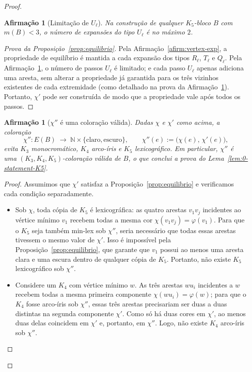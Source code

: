 \documentclass[reqno, 12pt]{amsart}
\numberwithin{equation}{section}
\theoremstyle{plain}
\newtheorem{afirmacao}[theorem]{Afirmação}
\theoremstyle{definition}
\newcommand{\maxdens}{m}
\begin{document}
\begin{proof}
\begin{afirmacao}[Limitação de $U_\ell$]
\label{afirm:ulimit}
Na construção de qualquer $K_5$-bloco $B$ com $\maxdens(B) < 3$,
o número de expansões do tipo $U_\ell$ é no máximo $2$.
\end{afirmacao}

\begin{proof}[Prova da Proposição~\ref{prop:equilibrio}]
Pela Afirmação~\ref{afirm:vertex-exp}, a propriedade de equilíbrio é mantida a cada
expansão dos tipos $R_\ell$, $T_\ell$ e $Q_\ell$.
Pela Afirmação~\ref{afirm:ulimit}, o número de passos $U_\ell$ é limitado;
e cada passo $U_\ell$ apenas adiciona uma aresta, sem alterar a propriedade já garantida para
os três vizinhos existentes de cada extremidade (como detalhado na prova da Afirmação~\ref{afirm:ulimit}).
Portanto, $\chi'$ pode ser construída de modo que a propriedade vale após todos os passos.
\end{proof}

\begin{afirmacao}[$\chi''$ é uma coloração válida]
\label{afirm:chipp}
Dadas $\chi$ e $\chi'$ como acima, a coloração
\[
  \chi'': E(B) \;\longrightarrow\; \mathbb{N} \times \{\text{claro}, \text{escuro}\},
  \qquad \chi''(e) := \bigl(\chi(e),\, \chi'(e)\bigr),
\]
evita $K_3$ monocromático, $K_4$ arco-íris e $K_5$ lexicográfico.
Em particular, $\chi''$ é uma $(K_3, K_4, K_5)$-coloração válida de $B$,
o que conclui a prova do Lema~\ref{lem:0-statement-K5}.
\end{afirmacao}

\begin{proof}
Assumimos que $\chi'$ satisfaz a Proposição~\ref{prop:equilibrio} e verificamos cada condição
separadamente.

\begin{itemize}
  \item Sob $\chi$, toda cópia de $K_5$ é lexicográfica: as quatro arestas $v_1v_j$
  incidentes ao vértice mínimo $v_1$ recebem todas a mesma cor $\chi(v_1v_j) = \varphi(v_1)$.
  Para que o $K_5$ seja também min-lex sob $\chi''$, seria necessário que todas essas
  arestas tivessem o mesmo valor de $\chi'$. Isso é impossível pela
  Proposição~\ref{prop:equilibrio}, que garante que $v_1$ possui ao menos uma aresta
  clara e uma escura dentro de qualquer cópia de $K_5$. Portanto, não existe
  $K_5$ lexicográfico sob $\chi''$.

  \item Considere um $K_4$ com vértice mínimo $w$. As três arestas $wu_i$ incidentes
  a $w$ recebem todas a mesma primeira componente $\chi(wu_i) = \varphi(w)$; para que
  o $K_4$ fosse arco-íris sob $\chi''$, essas três arestas precisariam ser duas a duas
  distintas na segunda componente $\chi'$. Como só há duas cores em $\chi'$, ao menos
  duas delas coincidem em $\chi'$ e, portanto, em $\chi''$. Logo, não existe
  $K_4$ arco-íris sob $\chi''$.


\end{itemize}
\end{proof}
\end{proof}
\end{document}
